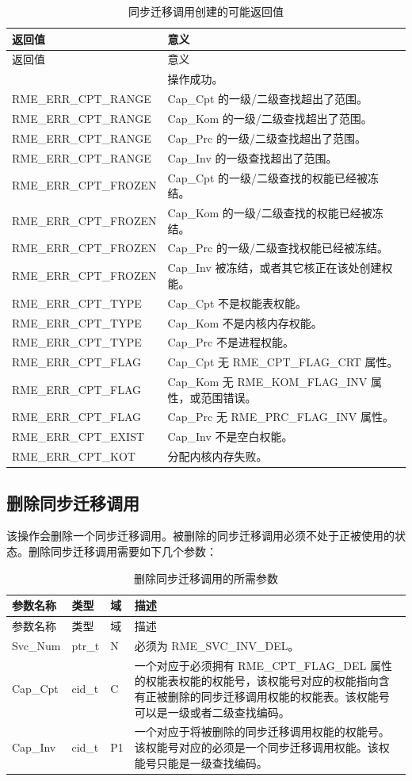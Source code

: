 \begin{xltabular}{\textwidth}{@{}>{\hsize\raggedright\arraybackslash}X>{\hsize\raggedright\arraybackslash}X@{}}
\caption{同步迁移调用创建的可能返回值}\label{tab:5-5-create-sync-invocation-return-values}\\
\toprule
返回值 & 意义\tabularnewline
\endfirsthead
\toprule
返回值 & 意义\tabularnewline
\midrule
\endhead
\bottomrule
{} & 操作成功。\tabularnewline
    RME\_ERR\_CPT\_RANGE & Cap\_Cpt 的一级/二级查找超出了范围。\tabularnewline
    RME\_ERR\_CPT\_RANGE & Cap\_Kom 的一级/二级查找超出了范围。\tabularnewline
    RME\_ERR\_CPT\_RANGE & Cap\_Prc 的一级/二级查找超出了范围。\tabularnewline
    RME\_ERR\_CPT\_RANGE & Cap\_Inv 的一级查找超出了范围。\tabularnewline
    RME\_ERR\_CPT\_FROZEN & Cap\_Cpt 的一级/二级查找的权能已经被冻结。\tabularnewline
    RME\_ERR\_CPT\_FROZEN & Cap\_Kom 的一级/二级查找的权能已经被冻结。\tabularnewline
    RME\_ERR\_CPT\_FROZEN & Cap\_Prc 的一级/二级查找权能已经被冻结。\tabularnewline
    RME\_ERR\_CPT\_FROZEN & Cap\_Inv 被冻结，或者其它核正在该处创建权能。\tabularnewline
    RME\_ERR\_CPT\_TYPE & Cap\_Cpt 不是权能表权能。\tabularnewline
    RME\_ERR\_CPT\_TYPE & Cap\_Kom 不是内核内存权能。\tabularnewline
    RME\_ERR\_CPT\_TYPE & Cap\_Prc 不是进程权能。\tabularnewline
    RME\_ERR\_CPT\_FLAG & Cap\_Cpt 无 RME\_CPT\_FLAG\_CRT 属性。\tabularnewline
    RME\_ERR\_CPT\_FLAG & Cap\_Kom 无 RME\_KOM\_FLAG\_INV 属性，或范围错误。\tabularnewline
    RME\_ERR\_CPT\_FLAG & Cap\_Prc 无 RME\_PRC\_FLAG\_INV 属性。\tabularnewline
    RME\_ERR\_CPT\_EXIST & Cap\_Inv 不是空白权能。\tabularnewline
    RME\_ERR\_CPT\_KOT & 分配内核内存失败。\tabularnewline
\end{xltabular}

\subsection{删除同步迁移调用}\label{subsec:5-delete-sync-invocation}

该操作会删除一个同步迁移调用。被删除的同步迁移调用必须不处于正被使用的状态。删除同步迁移调用需要如下几个参数：

\begin{xltabular}{\textwidth}{@{}>{\hsize\raggedright\arraybackslash}X>{\hsize\raggedright\arraybackslash}X>{\hsize\raggedright\arraybackslash}X>{\hsize\raggedright\arraybackslash}X@{}}
\caption{删除同步迁移调用的所需参数}\label{tab:5-6-delete-sync-invocation-parameters}\\
\toprule
参数名称 & 类型 & 域 & 描述\tabularnewline
\endfirsthead
\toprule
参数名称 & 类型 & 域 & 描述\tabularnewline
\midrule
\endhead
\bottomrule
\endlastfoot
Svc\_Num & ptr\_t & N & 必须为 RME\_SVC\_INV\_DEL。\tabularnewline
Cap\_Cpt & cid\_t & C &
一个对应于必须拥有 RME\_CPT\_FLAG\_DEL 属性的权能表权能的权能号，该权能号对应的权能指向含有正被删除的同步迁移调用权能的权能表。该权能号可以是一级或者二级查找编码。\tabularnewline
Cap\_Inv & cid\_t & P1 &
一个对应于将被删除的同步迁移调用权能的权能号。该权能号对应的必须是一个同步迁移调用权能。该权能号只能是一级查找编码。\tabularnewline
\end{xltabular}

